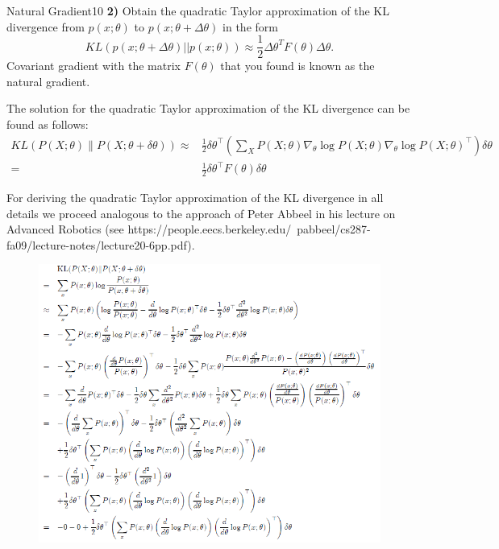 \begin{questions}
\begin{question}[bonus]{Natural Gradient}{10}
\textbf{2)} Obtain the quadratic Taylor approximation
of the KL divergence
from $p(x; \theta)$ to $p(x; \theta + \Delta \theta)$ in the form
\begin{equation*}
  KL(p(x; \theta + \Delta \theta) || p(x; \theta)) \approx
  \frac{1}{2}\Delta \theta^T F(\theta) \Delta \theta.
\end{equation*}
Covariant gradient with the matrix $F(\theta)$ that you found
is known as the natural gradient.
\begin{answer}
The solution for the quadratic Taylor approximation of the KL divergence can be found as follows:
\begin{align*}
K L(P(X ; \theta) \| P(X ; \theta+\delta \theta)) \approx & 
\frac{1}{2} \delta \theta^{\top}(\sum_{X} P(X ; \theta) \nabla_{\theta} \log P(X; \theta) \nabla_{\theta} \log P(X ; \theta)^{\top}) \delta \theta \\
= & \frac{1}{2} \delta \theta^{\top} F(\theta) \delta \theta
\end{align*}
\end{answer}
\begin{answer}
For deriving the quadratic Taylor approximation of the KL divergence in all details we proceed analogous to the approach of Peter Abbeel in his lecture on Advanced Robotics (see https://people.eecs.berkeley.edu/~pabbeel/cs287-fa09/lecture-notes/lecture20-6pp.pdf).
\end{answer}
\begin{figure}[h]
	\includegraphics[width=15.5cm, scale=1]{abbeel.png}
	\label{fig:abbeel}
\end{figure}
\end{question}




\end{questions}
